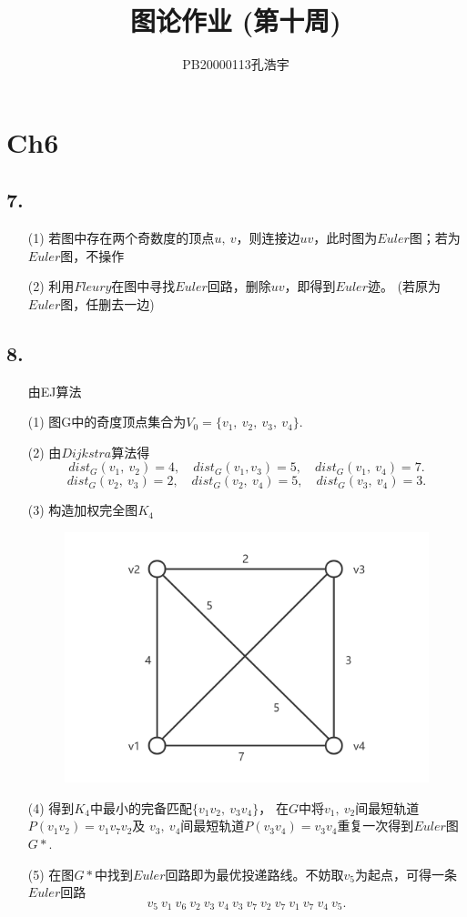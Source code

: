 \documentclass{article}
\title{图论作业 (第十周)}
\author{PB20000113孔浩宇}
\begin{document}
\maketitle
\section*{Ch6}
\subsection*{7.}
\begin{enumerate}
    \item [(1)]若图中存在两个奇数度的顶点$u,\ v$，则连接边$uv$，此时图为$Euler$图；若为$Euler$图，不操作
    \item [(2)]利用$Fleury$在图中寻找$Euler$回路，删除$uv$，即得到$Euler$迹。 (若原为$Euler$图，任删去一边)
\end{enumerate}

\subsection*{8.}
\begin{enumerate}
    \item []由EJ算法
    \item [(1)]图G中的奇度顶点集合为$V_0=\{v_1,\ v_2,\ v_3,\ v_4 \}$.
    \item [(2)]由$Dijkstra$算法得
    \[
        {dist}_{G}(v_1,\ v_2)=4, \quad {dist}_{G}(v_1,v_3)=5, \quad {dist}_{G}(v_1,\ v_4)=7.
    \]
    \[
        {dist}_{G}(v_2,\ v_3)=2, \quad {dist}_{G}(v_2,\ v_4)=5, \quad {dist}_{G}(v_3,\ v_4)=3.
    \]
    \item [(3)]构造加权完全图$K_4$
    \begin{figure}[htbp]
        \centering
        \includegraphics[scale=0.15]{t83.png}
    \end{figure}
    \item [(4)]得到$K_4$中最小的完备匹配$\{v_1 v_2,\ v_3 v_4\}$，
    在$G$中将$v_1,\ v_2$间最短轨道$P(v_1 v_2)=v_1 v_7 v_2$及
    $v_3,\ v_4$间最短轨道$P(v_3 v_4)=v_3 v_4$重复一次得到$Euler$图$G *$.
    \item [(5)]在图$G*$中找到$Euler$回路即为最优投递路线。不妨取$v_5$为起点，可得一条$Euler$回路
    \[
        v_5\ v_1\ v_6\ 
        v_2\ v_3\ v_4\ 
        v_3\ v_7\ v_2\ 
        v_7\ v_1\ v_7\ 
        v_4\ v_5 .
    \]
\end{enumerate}
\end{document}
